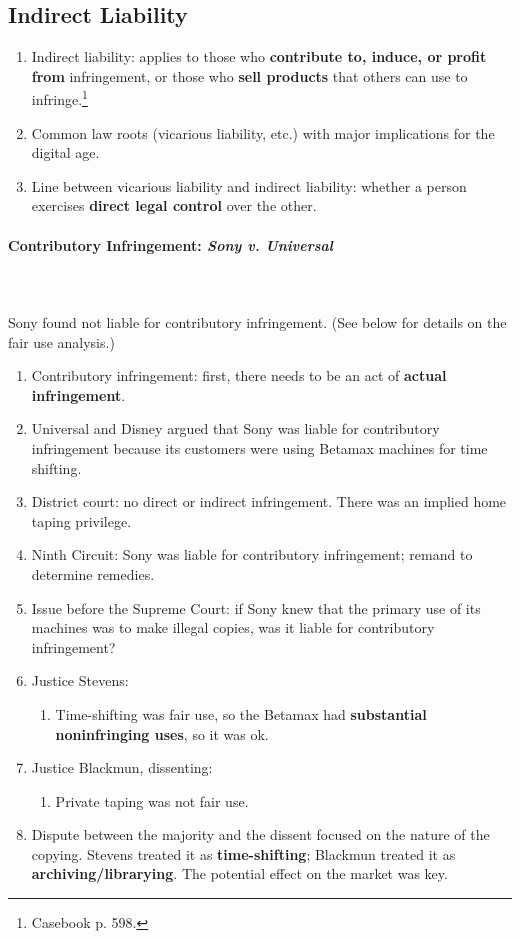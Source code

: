\subsection{Indirect Liability}

\begin{enumerate}
    \item Indirect liability: applies to those who \textbf{contribute to, 
    induce, or profit from} infringement, or those who \textbf{sell products} 
    that others can use to infringe.\footnote{Casebook p. 598.}
    \item Common law roots (vicarious liability, etc.) with major implications 
    for the digital age.
    \item Line between vicarious liability and indirect liability: whether a 
    person exercises \textbf{direct legal control} over the other.
\end{enumerate}

\paragraph{Contributory Infringement: \emph{Sony v. Universal}}
~\\\\
Sony found not liable for contributory infringement. (See below for details on 
the fair use analysis.)

\begin{enumerate}
    \item Contributory infringement: first, there needs to be an act of 
    \textbf{actual infringement}.
    \item Universal and Disney argued that Sony was liable for contributory 
    infringement because its customers were using Betamax machines for time 
    shifting.
    \item District court: no direct or indirect infringement. There was an 
    implied home taping privilege.
    \item Ninth Circuit: Sony was liable for contributory infringement; remand 
    to determine remedies.
    \item Issue before the Supreme Court: if Sony knew that the primary use of 
    its machines was to make illegal copies, was it liable for contributory 
    infringement?
    \item Justice Stevens:
    \begin{enumerate}
        \item Time-shifting was fair use, so the Betamax had 
        \textbf{substantial noninfringing uses}, so it was ok.
    \end{enumerate}
    \item Justice Blackmun, dissenting: 
    \begin{enumerate}
        \item Private taping was not fair use.
    \end{enumerate}
    \item Dispute between the majority and the dissent focused on the nature 
    of the copying. Stevens treated it as \textbf{time-shifting}; Blackmun 
    treated it as \textbf{archiving/librarying}. The potential effect on the 
    market was key.
\end{enumerate}

